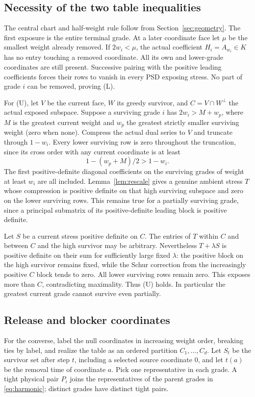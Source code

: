 \subsection{Necessity of the two table inequalities}
The central chart and half-weight rule follow from Section~\ref{sec:geometry}. The first exposure is the entire terminal grade. At a later coordinate face let $\mu$ be the smallest weight already removed. If $2w_i<\mu$, the actual coefficient $H_i=A_{w_i}\in K$ has no entry touching a removed coordinate. All its own and lower-grade coordinates are still present. Successive pairing with the positive leading coefficients forces their rows to vanish in every PSD exposing stress. No part of grade $i$ can be removed, proving (L).

For (U), let $V$ be the current face, $W$ its greedy survivor, and $C=V\cap W^\perp$ the actual exposed subspace. Suppose a surviving grade $i$ has $2w_i>M+w_p$, where $M$ is the greatest current weight and $w_p$ the greatest strictly smaller surviving weight (zero when none). Compress the actual dual series to $V$ and truncate through $1-w_i$. Every lower surviving row is zero throughout the truncation, since its cross order with any current coordinate is at least
\[
 1-(w_p+M)/2>1-w_i.
\]
The first positive-definite diagonal coefficients on the surviving grades of weight at least $w_i$ are all included. Lemma~\ref{lem:rescale} gives a genuine ambient stress $T$ whose compression is positive definite on that high surviving subspace and zero on the lower surviving rows. This remains true for a partially surviving grade, since a principal submatrix of its positive-definite leading block is positive definite.

Let $S$ be a current stress positive definite on $C$. The entries of $T$ within $C$ and between $C$ and the high survivor may be arbitrary. Nevertheless $T+\lambda S$ is positive definite on their sum for sufficiently large fixed $\lambda$: the positive block on the high survivor remains fixed, while the Schur correction from the increasingly positive $C$ block tends to zero. All lower surviving rows remain zero. This exposes more than $C$, contradicting maximality. Thus (U) holds. In particular the greatest current grade cannot survive even partially.

\subsection{Release and blocker coordinates}
For the converse, label the null coordinates in increasing weight order, breaking ties by label, and realize the table as an ordered partition $C_1,\ldots,C_d$. Let $S_t$ be the survivor set after step $t$, including a selected source coordinate $0$, and let $t(a)$ be the removal time of coordinate $a$. Pick one representative in each grade. A tight physical pair $P_i$ joins the representatives of the parent grades in \eqref{eq:harmonic}; distinct grades have distinct tight pairs.

